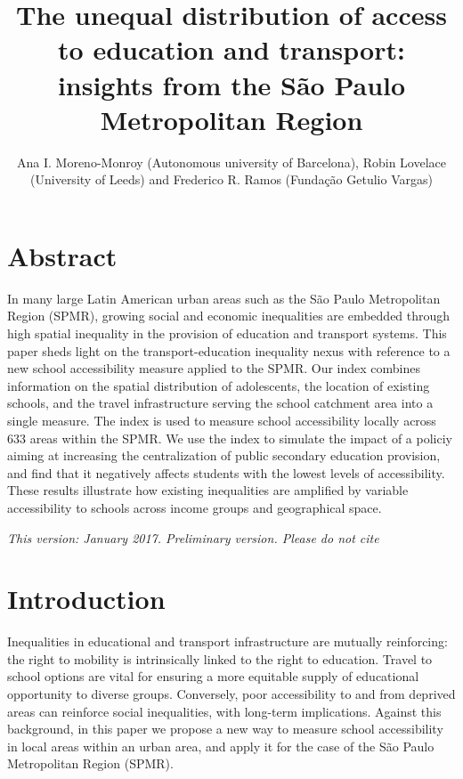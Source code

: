 \documentclass[]{article}
\title{The unequal distribution of access to education and transport: insights
from the São Paulo Metropolitan Region}
\author{Ana I. Moreno-Monroy (Autonomous university of Barcelona), Robin Lovelace
(University of Leeds) and Frederico R. Ramos (Fundação Getulio Vargas)}
\date{}
\begin{document}
\maketitle


\section{Abstract}\label{abstract}

In many large Latin American urban areas such as the São Paulo
Metropolitan Region (SPMR), growing social and economic inequalities are
embedded through high spatial inequality in the provision of education
and transport systems. This paper sheds light on the transport-education
inequality nexus with reference to a new school accessibility measure
applied to the SPMR. Our index combines information on the spatial
distribution of adolescents, the location of existing schools, and the
travel infrastructure serving the school catchment area into a single
measure. The index is used to measure school accessibility locally
across 633 areas within the SPMR. We use the index to simulate the
impact of a policiy aiming at increasing the centralization of public
secondary education provision, and find that it negatively affects
students with the lowest levels of accessibility. These results
illustrate how existing inequalities are amplified by variable
accessibility to schools across income groups and geographical space.

\bigskip

\textit{This version: January 2017. Preliminary version. Please do not cite}

\section{Introduction}\label{introduction}

Inequalities in educational and transport infrastructure are mutually
reinforcing: the right to mobility is intrinsically linked to the right
to education. Travel to school options are vital for ensuring a more
equitable supply of educational opportunity to diverse groups.
Conversely, poor accessibility to and from deprived areas can reinforce
social inequalities, with long-term implications. Against this
background, in this paper we propose a new way to measure school
accessibility in local areas within an urban area, and apply it for the
case of the São Paulo Metropolitan Region (SPMR).
\end{document}
